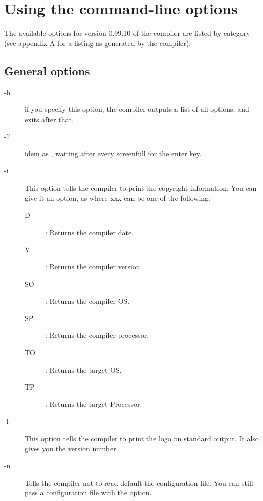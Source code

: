 \documentclass{report}
\begin{document}
\section{Using the command-line options}

The available options for version 0.99.10 of the compiler are listed by
category (see appendix A for a listing as generated by the compiler):

%
%

\subsection{General options}
\begin{description}
\item[-h] if you specify this option, the compiler outputs a list of all options,
and exits after that.
\item[-?] idem as , waiting after every screenfull for the enter key.
\item[-i] This option tells the compiler to print the copyright information.
 You can give it an option, as  where xxx can be one of the
following:
\begin{description}
\item[D] : Returns the compiler date.
\item[V] : Returns the compiler version.
\item[SO] : Returns the compiler OS.
\item[SP] : Returns the compiler processor.
\item[TO] : Returns the target OS.
\item[TP] : Returns the target Processor.
\end{description}
\item[-l] This option tells the compiler to print the \fpc logo on standard
output. It also gives you the \fpc version number.
\item [-n] Tells the compiler not to read default the configuration file.
You can still pass a configuration file with the  option.
\end{description}

%
%
\end{document}
